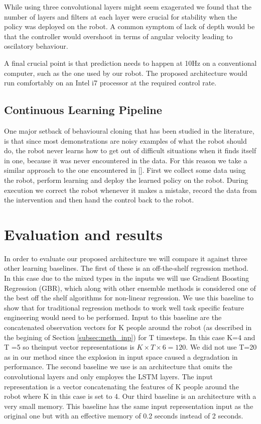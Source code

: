 \documentclass[letterpaper, 10 pt, conference]{ieeeconf}
\begin{document}
While using three convolutional layers might seem exagerated we found that the number of layers and filters at each layer were crucial for stability when the policy was deployed on the robot. A common symptom of lack of depth would be that the controller would overshoot in terms of angular velocity leading to oscilatory behaviour. 

A final crucial point is that prediction needs to happen at 10Hz on a conventional computer, such as the one used by our robot. The proposed architecture would run comfortably on an Intel i7 processor at the required control rate.


\subsection{Continuous Learning Pipeline}
One major setback of behavioural cloning that has been studied in the literature, is that since most demonstrations are noisy examples of what the robot should do, the robot never learns how to get out of difficult situations when it finds itself in one, because it was never encountered in the data. For this reason we take a similar approach to the one encountered in []. First we collect some data using the robot, perform learning and deploy the learned policy on the robot. During execution we correct the robot whenever it makes a mistake, record the data from the intervention and then hand the control back to the robot.


\section{Evaluation and results}
In order to evaluate our proposed architecture we will compare it against three other learning baselines. The first of these is an off-the-shelf regression method. In this case due to the mixed types in the inputs we will use Gradient Boosting Regression (GBR), which along with other ensemble methods is considered one of the best off the shelf algorithms for non-linear regression. We use this baseline to show that for traditional regression methods to work well task specific feature engineering would need to be performed. Input to this baseline are the concatenated observation vectors for K people around the robot (as described in the begining of Section \ref{subsec:meth_inp}) for T timesteps. In this case K=4 and T =5 so theinput vector representations is $K\times T \times 6 = 120$. We did not use T=20 as in our method since the explosion in input space caused a degradation in performance. The second baseline we use is an architecture that omits the convolutional layers and only employes the LSTM layers. The input representation is a vector concatenating the features of K people around the robot where K in this case is set to 4. Our third baseline is an architecture with a very small memory. This baseline has the same input representation input as the original one but with an effective memory of 0.2 seconds instead of 2 seconds.
\end{document}

